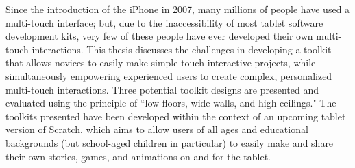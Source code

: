 % 
% 
%

Since the introduction of the iPhone in 2007, many millions of people have used a multi-touch interface; but, due to the inaccessibility of most tablet software development kits, very few of these people have ever developed their own multi-touch interactions. This thesis discusses the challenges in developing a toolkit that allows novices to easily make simple touch-interactive projects, while simultaneously empowering experienced users to create complex, personalized multi-touch interactions. Three potential toolkit designs are presented and evaluated using the principle of ``low floors, wide walls, and high ceilings." The toolkits presented have been developed within the context of an upcoming tablet version of Scratch, which aims to allow users of all ages and educational backgrounds (but school-aged children in particular) to easily make and share their own stories, games, and animations on and for the tablet.